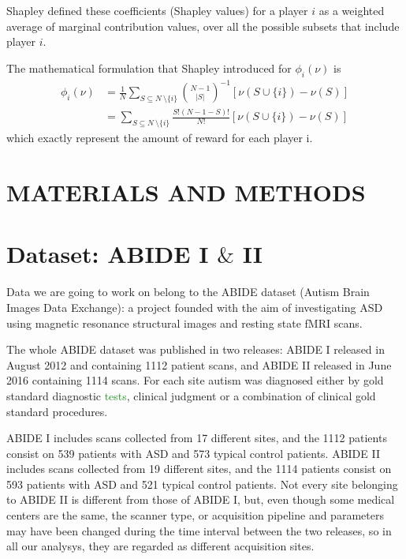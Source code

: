 \documentclass[11pt]{report}
\begin{document}
Shapley defined these coefficients (Shapley values) for a player $i$ as a weighted average of marginal contribution values, over all the possible subsets that include player $i$.

The mathematical formulation that Shapley introduced for $\phi_i(\nu)$ is
\begin{equation}
\begin{aligned}
\phi_i(\nu)  & = \frac{1}{N }\sum_{S\subseteq N\ \setminus \{ i \} }  {N- 1 \choose |S|}^{-1} [\nu (S \cup \{ i \}) - \nu(S)] \\
& = \sum_{S\subseteq N\ \setminus \{ i \} }  \frac{S! (N-1-S)!}{N!} [\nu (S \cup \{ i \}) - \nu(S) ]
\end{aligned}
\end{equation}
which exactly represent the amount of reward for each player i.



\chapter*{MATERIALS AND METHODS}

\chapter{Dataset: ABIDE I $\&$ II}\label{chap:dataset}


Data we are going to work on belong to the ABIDE dataset (Autism Brain Images Data Exchange): a project founded with the aim of investigating ASD using magnetic resonance structural images and resting state fMRI scans.

The whole ABIDE dataset was published in two releases: ABIDE I released in August 2012 and containing 1112 patient scans, and ABIDE II released in June 2016 containing 1114 scans.
For each site autism was diagnosed either by gold standard diagnostic \textcolor{ForestGreen}{tests}, clinical judgment or a combination of clinical gold standard procedures.

ABIDE I includes scans collected from 17 different sites, and the 1112 patients consist on 539 patients with ASD and 573 typical control patients.
ABIDE II includes scans collected from 19 different sites, and the 1114 patients consist on 593 patients with ASD and 521 typical control patients.
Not every site belonging to ABIDE II is different from those of ABIDE I, but, even though some medical centers are the same, the scanner type, or acquisition pipeline and parameters may have been changed during the time interval between the two releases, so in all our analysys, they are regarded as different acquisition sites.
\end{document}
